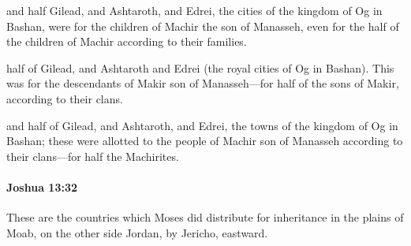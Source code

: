 			\begin{versebox}
					\item[BHS] 
					\item[ASV] and half Gilead, and Ashtaroth, and Edrei, the cities of the kingdom of Og in Bashan, were for the children of Machir the son of Manasseh, even for the half of the children of Machir according to their families.
					\item[NIV] half of Gilead, and Ashtaroth and Edrei (the royal cities of Og in Bashan). This was for the descendants of Makir son of Manasseh—for half of the sons of Makir, according to their clans.
					\item[NRSV] and half of Gilead, and Ashtaroth, and Edrei, the towns of the kingdom of Og in Bashan; these were allotted to the people of Machir son of Manasseh according to their clans—for half the Machirites.
			\end{versebox}

		\paragraph{Joshua 13:32} %
			\label{JOSHUA-13-32}

			These are the countries which Moses did distribute for inheritance in the plains of Moab, on the other side Jordan, by Jericho, eastward.

